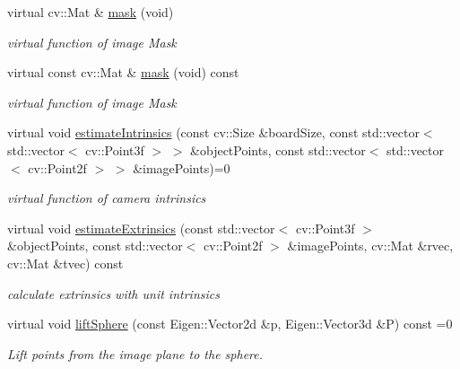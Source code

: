 \begin{DoxyCompactItemize}
virtual cv\+::\+Mat \& \hyperlink{classcamodocal_1_1Camera_a1c74aa165487ef4eea0d11ded7946ad1}{mask} (void)
\begin{DoxyCompactList}\small\item\em virtual function of image Mask \end{DoxyCompactList}\item 
\mbox{\label{classcamodocal_1_1Camera_ab2ef0e5f32fc81f9c568be1234da168b}} 
virtual const cv\+::\+Mat \& \hyperlink{classcamodocal_1_1Camera_ab2ef0e5f32fc81f9c568be1234da168b}{mask} (void) const
\begin{DoxyCompactList}\small\item\em virtual function of image Mask \end{DoxyCompactList}\item 
\mbox{\label{classcamodocal_1_1Camera_a5b24bfc1b1c88642a99c8ddd8f74d085}} 
virtual void \hyperlink{classcamodocal_1_1Camera_a5b24bfc1b1c88642a99c8ddd8f74d085}{estimate\+Intrinsics} (const cv\+::\+Size \&board\+Size, const std\+::vector$<$ std\+::vector$<$ cv\+::\+Point3f $>$ $>$ \&object\+Points, const std\+::vector$<$ std\+::vector$<$ cv\+::\+Point2f $>$ $>$ \&image\+Points)=0
\begin{DoxyCompactList}\small\item\em virtual function of camera intrinsics \end{DoxyCompactList}\item 
virtual void \hyperlink{classcamodocal_1_1Camera_a2a6d99ee0927e0336b4d77a9773900a4}{estimate\+Extrinsics} (const std\+::vector$<$ cv\+::\+Point3f $>$ \&object\+Points, const std\+::vector$<$ cv\+::\+Point2f $>$ \&image\+Points, cv\+::\+Mat \&rvec, cv\+::\+Mat \&tvec) const
\begin{DoxyCompactList}\small\item\em calculate extrinsics with unit intrinsics \end{DoxyCompactList}\item 
\mbox{\label{classcamodocal_1_1Camera_a77b4ea673c694741302efba6f86a0100}} 
virtual void \hyperlink{classcamodocal_1_1Camera_a77b4ea673c694741302efba6f86a0100}{lift\+Sphere} (const Eigen\+::\+Vector2d \&p, Eigen\+::\+Vector3d \&P) const =0
\begin{DoxyCompactList}\small\item\em Lift points from the image plane to the sphere. \end{DoxyCompactList}\item 

\end{DoxyCompactItemize}
